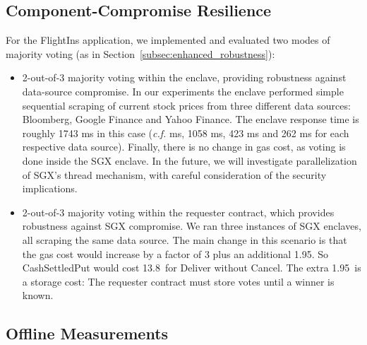 \subsection{Component-Compromise Resilience}
\label{subsec:hedging}
For the {\sf FlightIns} application, 
we implemented and evaluated two modes of majority voting (as in Section~\ref{subsec:enhanced_robustness}):
\begin{itemize}[leftmargin=3mm]
  \setlength{\itemsep}{2pt}
  \setlength{\parskip}{0pt}
  \setlength{\parsep}{0pt}
\item
2-out-of-3 majority voting within the enclave, providing robustness
against data-source compromise. 
In our experiments
the enclave performed simple sequential scraping of current stock prices 
from three different data sources: Bloomberg, Google Finance and Yahoo Finance.
The enclave response time is roughly
1743 ms in this case ({\it c.f.} ms, 
1058 ms, 423 ms and 262 ms for 
each respective data source). Finally, there is no change in gas cost, as voting is done
inside the SGX enclave.
In the future, we will investigate parallelization of SGX's thread mechanism, with careful consideration of the security implications.


\item
2-out-of-3 majority voting within the requester contract,
which provides robustness against 
SGX compromise.
We ran three instances of SGX enclaves, all scraping
the same data source.  
The main change in this scenario is that 
the gas cost would increase by a factor of 3 plus an additional 1.95\textcent.
So {\sf CashSettledPut} would cost 13.8\textcent\ for Deliver without Cancel.
The extra 1.95\textcent\ is a storage cost: The requester contract must store votes
until a winner is known.
\end{itemize}




\subsection{Offline Measurements}



